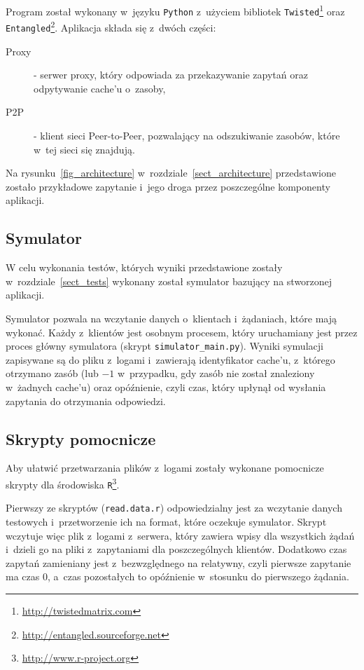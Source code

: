 \documentclass[a4paper,11pt]{scrartcl}
\newcommand{\f}{\texttt}
\newcommand{\s}{ }
\newcommand{\keszu}{cache'u}
\begin{document}
Program został wykonany w~języku \f{Python} z~użyciem bibliotek \f{Twisted}\footnote{\url{http://twistedmatrix.com}} oraz \f{Entangled}\footnote{\url{http://entangled.sourceforge.net}}. Aplikacja składa się z~dwóch części:
\begin{description}
  \item[Proxy]{ - serwer proxy, który odpowiada za przekazywanie zapytań oraz odpytywanie \keszu\s o~zasoby,}
  \item[P2P]{ - klient sieci Peer-to-Peer, pozwalający na odszukiwanie zasobów, które w~tej sieci się znajdują.}
\end{description}
Na rysunku~\ref{fig_architecture} w~rozdziale~\ref{sect_architecture} przedstawione zostało przykładowe zapytanie i~jego droga przez poszczególne komponenty aplikacji. 

\subsection{Symulator}
\label{sect_impl_simulator}
W celu wykonania testów, których wyniki przedstawione zostały w~rozdziale~\ref{sect_tests} wykonany został symulator bazujący na stworzonej aplikacji. 

Symulator pozwala na wczytanie danych o~klientach i~żądaniach, które mają wykonać. Każdy z~klientów jest osobnym procesem, który uruchamiany jest przez proces główny symulatora (skrypt \f{simulator\_main.py}). Wyniki symulacji zapisywane są do pliku z~logami i~zawierają identyfikator \keszu, z~którego otrzymano zasób (lub $-1$ w~przypadku, gdy zasób nie został znaleziony w~żadnych \keszu) oraz opóźnienie, czyli czas, który upłynął od wysłania zapytania do otrzymania odpowiedzi.

\subsection{Skrypty pomocnicze}
Aby ułatwić przetwarzania plików z~logami zostały wykonane pomocnicze skrypty dla środowiska \f{R}\footnote{\url{http://www.r-project.org}}. 

Pierwszy ze skryptów (\f{read.data.r}) odpowiedzialny jest za wczytanie danych testowych i~przetworzenie ich na format, które oczekuje symulator. Skrypt wczytuje więc plik z~logami z~serwera, który zawiera wpisy dla wszystkich żądań i~dzieli go na pliki z~zapytaniami dla poszczególnych klientów. Dodatkowo czas zapytań zamieniany jest z~bezwzględnego na relatywny, czyli pierwsze zapytanie ma czas $0$, a~czas pozostałych to opóźnienie w~stosunku do pierwszego żądania.
\end{document}
